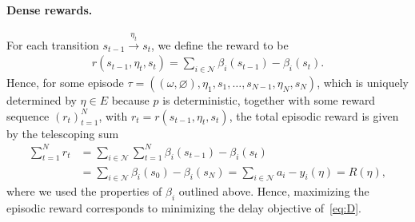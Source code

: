 \documentclass{report}
\theoremstyle{definition}
\theoremstyle{plain}
\begin{document}
\paragraph{Dense rewards.}
For each transition $s_{t-1} \xrightarrow{\eta_{t}} s_{t}$, we define the reward to
be
\begin{align}
  r(s_{t-1}, \eta_t, s_t) = \sum_{i \in \mathcal{N}} \beta_{i}(s_{t-1}) - \beta_{i}(s_t) .
\end{align}
Hence, for some episode
$\tau = ((\omega, \varnothing), \eta_1, s_1, \dots, s_{N-1}, \eta_N, s_N)$, which is
uniquely determined by $\eta \in E$ because $p$ is deterministic, together
with some reward sequence ${(r_t)}_{t=1}^N$, with
$r_t = r(s_{t-1}, \eta_t, s_t)$, the total episodic reward is given by the
telescoping sum
\begin{align*}
  \sum_{t=1}^{N} r_{t} &= \sum_{i \in \mathcal{N}} \sum_{t=1}^N \beta_i(s_{t-1}) - \beta_i(s_t) \\
  &= \sum_{i \in \mathcal{N}} \beta_i(s_0) - \beta_i(s_N) = \sum_{i \in \mathcal{N}} a_i - y_i(\eta) = R(\eta) ,
\end{align*}
where we used the properties of $\beta_i$ outlined above. Hence, maximizing the
episodic reward corresponds to minimizing the delay objective of~\eqref{eq:D}.
\end{document}
